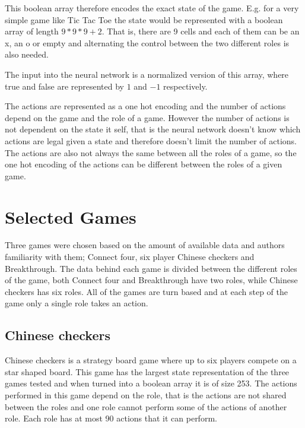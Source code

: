 \documentclass[twocolumn, letterpaper, 10 pt, conference]{ieeeconf}  %
\begin{document}
    This boolean array therefore encodes the exact state of the game. E.g. for a very simple game like Tic Tac Toe the state would be represented with a boolean array of length $9*9*9+2$. That is, there are 9 cells and each of them can be an x, an o or empty and alternating the control between the two different roles is also needed. 
    
    The input into the neural network is a normalized version of this array, where true and false are represented by $1$ and $-1$ respectively.

    The actions are represented as a one hot encoding and the number of actions depend on the game and the role of a game. However the number of actions is not dependent on the state it self, that is the neural network doesn't know which actions are legal given a state and therefore doesn't limit the number of actions. The actions are also not always the same between all the roles of a game, so the one hot encoding of the actions can be different between the roles of a given game.

\section{Selected Games}
    Three games were chosen based on the amount of available data and authors familiarity with them; Connect four, six player Chinese checkers and Breakthrough. The data behind each game is divided between the different roles of the game, both Connect four and Breakthrough have two roles, while Chinese checkers has six roles. All of the games are turn based and at each step of the game only a single role takes an action. 
     
    \subsection{Chinese checkers}
    Chinese checkers is a strategy board game where up to six players compete on a star shaped board. This game has the largest state representation of the three games tested and when turned into a boolean array it is of size 253. The actions performed in this game depend on the role, that is the actions are not shared between the roles and one role cannot perform some of the actions of another role. Each role has at most 90 actions that it can perform.
    
\end{document}
